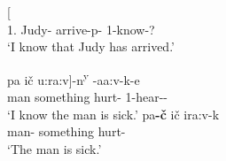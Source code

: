 \begin{exe}\ex\label{MojComp}
\begin{xlist}
\ex\gll{}  {\rm[} \textipa{iva:-p-m}{\rm]} \\
1\sg{}.\nom{} Judy-\nom{} arrive-p-\dsbj{} 1-know-?\\
\glt `I know that Judy has arrived.'

\ex\gll  {\rm[}pa \textglotstop i\v c u:ra:v{\rm]}-n\textsuperscript{y} \textglotstop-a\textglotstop a:v-k-e\\
man something hurt-\dem{} 1-hear-\tns{}-\augv{}\\
\glt `I know the man is sick.'
\ex\gll pa\textbf{-\v c} \textglotstop i\v c ira:v-k\\
man-\nom{} something hurt-\tns{}\\
\glt `The man is sick.'
\end{xlist} 
\end{exe}


